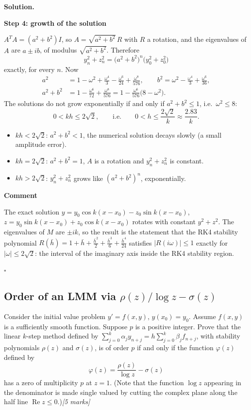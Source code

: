 \documentclass[11pt,a4paper]{article}
\newenvironment{solution}
  {\par\noindent\textbf{Solution.}\par\nobreak}
  {\par\hfill\(\square\)\par}
\newcommand{\step}[1]{\par\addvspace{0.5em}\noindent\textbf{#1}\par\nobreak}
\newcommand{\mk}[1]{\hfill\textit{[#1 marks]}}
\begin{document}
\begin{solution}
\step{Step 4: growth of the solution}
\(A^TA=(a^2+b^2)I\), so \(A=\sqrt{a^2+b^2}\,R\) with \(R\) a rotation,
and the eigenvalues of \(A\) are \(a\pm ib\), of modulus
\(\sqrt{a^2+b^2}\).  Therefore
\[
  y_n^2+z_n^2=\bigl(a^2+b^2\bigr)^n\bigl(y_0^2+z_0^2\bigr)
\]
exactly, for every \(n\).  Now
\begin{align*}
  a^2&=1-\omega^2+\frac{\omega^4}3-\frac{\omega^6}{24}+\frac{\omega^8}{576},\qquad
  b^2=\omega^2-\frac{\omega^4}3+\frac{\omega^6}{36},\\
  a^2+b^2&=1-\frac{\omega^6}{72}+\frac{\omega^8}{576}
  =1-\frac{\omega^6}{576}\bigl(8-\omega^2\bigr).
\end{align*}
The solutions do not grow exponentially if and only if
\(a^2+b^2\le1\), i.e.\ \(\omega^2\le8\):
\[
  \boxed{\;0<kh\le2\sqrt2,\qquad\text{i.e.}\qquad 0<h\le\frac{2\sqrt2}{k}\approx\frac{2.83}{k}.\;}
\]
\begin{itemize}
  \item \(kh<2\sqrt2\): \(a^2+b^2<1\), the numerical solution decays
    slowly (a small amplitude error).
  \item \(kh=2\sqrt2\): \(a^2+b^2=1\), \(A\) is a rotation and
    \(y_n^2+z_n^2\) is constant.
  \item \(kh>2\sqrt2\): \(y_n^2+z_n^2\) grows like
    \((a^2+b^2)^n\), exponentially.
\end{itemize}

\step{Comment}
The exact solution
\(y=y_0\cos k(x-x_0)-z_0\sin k(x-x_0)\),
\(z=y_0\sin k(x-x_0)+z_0\cos k(x-x_0)\) rotates with constant
\(y^2+z^2\).  The eigenvalues of \(M\) are \(\pm ik\), so the result is
the statement that the RK4 stability polynomial
\(R(\bar h)=1+\bar h+\frac{\bar h^2}2+\frac{\bar h^3}6+\frac{\bar h^4}{24}\)
satisfies \(|R(i\omega)|\le1\) exactly for \(|\omega|\le2\sqrt2\): the
interval of the imaginary axis inside the RK4 stability region.
\end{solution}

\subsection{Order of an LMM via \texorpdfstring{\(\rho(z)/\log z-\sigma(z)\)}{rho/log - sigma}}

\begin{qbox}
Consider the initial value problem \(y'=f(x,y)\), \(y(x_0)=y_0\).
Assume \(f(x,y)\) is a sufficiently smooth function.  Suppose \(p\) is
a positive integer.  Prove that the linear \(k\)-step method defined by
\(\sum_{j=0}^k\alpha_jy_{n+j}=h\sum_{j=0}^k\beta_jf_{n+j}\), with
stability polynomials \(\rho(z)\) and \(\sigma(z)\), is of order \(p\)
if and only if the function \(\varphi(z)\) defined by
\[
  \varphi(z)=\frac{\rho(z)}{\log z}-\sigma(z)
\]
has a zero of multiplicity \(p\) at \(z=1\).  (Note that the function
\(\log z\) appearing in the denominator is made single valued by
cutting the complex plane along the half line \(\operatorname{Re}z\le0\).)\mk{5}
\end{qbox}
\end{document}
